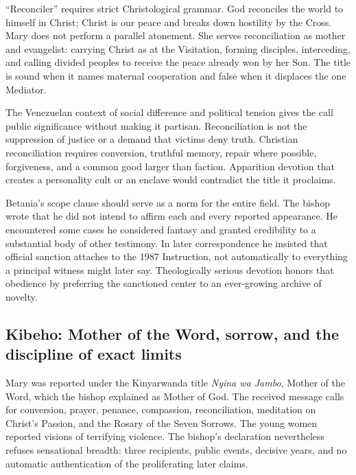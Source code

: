 ``Reconciler'' requires strict Christological grammar. God reconciles the world to himself in Christ; Christ is our peace and breaks down hostility by the Cross. Mary does not perform a parallel atonement. She serves reconciliation as mother and evangelist: carrying Christ as at the Visitation, forming disciples, interceding, and calling divided peoples to receive the peace already won by her Son. The title is sound when it names maternal cooperation and false when it displaces the one Mediator.

The Venezuelan context of social difference and political tension gives the call public significance without making it partisan. Reconciliation is not the suppression of justice or a demand that victims deny truth. Christian reconciliation requires conversion, truthful memory, repair where possible, forgiveness, and a common good larger than faction. Apparition devotion that creates a personality cult or an enclave would contradict the title it proclaims.

Betania's scope clause should serve as a norm for the entire field. The bishop wrote that he did not intend to affirm each and every reported appearance. He encountered some cases he considered fantasy and granted credibility to a substantial body of other testimony. In later correspondence he insisted that official sanction attaches to the 1987 Instruction, not automatically to everything a principal witness might later say. Theologically serious devotion honors that obedience by preferring the sanctioned center to an ever-growing archive of novelty.

\subsection{Kibeho: Mother of the Word, sorrow, and the discipline of exact limits}


Mary was reported under the Kinyarwanda title \emph{Nyina wa Jambo}, Mother of the Word, which the bishop explained as Mother of God. The received message calls for conversion, prayer, penance, compassion, reconciliation, meditation on Christ's Passion, and the Rosary of the Seven Sorrows. The young women reported visions of terrifying violence. The bishop's declaration nevertheless refuses sensational breadth: three recipients, public events, decisive years, and no automatic authentication of the proliferating later claims.

